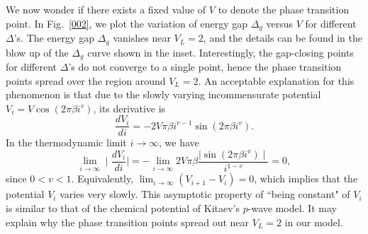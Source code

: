 \documentclass[prb,showpacs,twocolumn,aps,superscriptaddress,a4paper]{revtex4-1}
\begin{document}
We now wonder if there exists a fixed value of $V$ to denote the phase transition point. In Fig.~\ref{002}, we plot the variation of energy gap $\Delta_g$ versus $V$ for different $\Delta$'s. The energy gap $\Delta_g$ vanishes near $V_L=2$, and the details can be found in the blow up of the $\Delta_g$ curve shown in the inset. Interestingly, the gap-closing points for different $\Delta$'s do not converge to a single point, hence the phase transition points spread over the region around $V_L=2$. An acceptable explanation for this phenomenon is that due to the slowly varying incommensurate potential $V_{i}=V\cos(2\pi\beta{i^{v}})$, its derivative is
\begin{equation}\label{tb2}
\frac{dV_{i}}{di}=-2V\pi\beta i^{v-1}\sin(2\pi\beta{i^{v}}).
\end{equation}
In the thermodynamic limit $ i \rightarrow \infty$, we have
\begin{equation}\label{tb3}
\lim_{i\rightarrow\infty} \mid\frac{dV_{i}}{di}\mid=-\lim_{i\rightarrow\infty}  2V\pi\beta \frac{\mid\sin(2\pi\beta{i^{v}})\mid}{i^{1-v}}=0,
\end{equation}
since $0<v<1$. Equivalently, $\lim_{i\rightarrow\infty}( V_{i+1} - V_{i})= 0$, which implies that the potential $V_{i}$ varies very slowly. This asymptotic property of ``being constant" of $V_{i}$ is similar to that of the chemical potential of Kitaev's $p$-wave model. It may explain why the phase transition points spread out near $V_L=2$ in our model.
\end{document}
